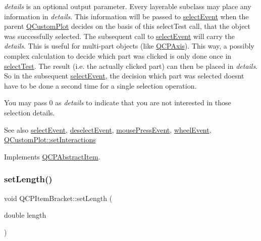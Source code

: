 {\itshape details} is an optional output parameter. Every layerable subclass may place any information in {\itshape details}. This information will be passed to \mbox{\hyperlink{class_q_c_p_abstract_item_aa4b969c58797f39c9c0b6c07c7869d17}{select\+Event}} when the parent \mbox{\hyperlink{class_q_custom_plot}{Q\+Custom\+Plot}} decides on the basis of this select\+Test call, that the object was successfully selected. The subsequent call to \mbox{\hyperlink{class_q_c_p_abstract_item_aa4b969c58797f39c9c0b6c07c7869d17}{select\+Event}} will carry the {\itshape details}. This is useful for multi-\/part objects (like \mbox{\hyperlink{class_q_c_p_axis}{Q\+C\+P\+Axis}}). This way, a possibly complex calculation to decide which part was clicked is only done once in \mbox{\hyperlink{class_q_c_p_item_bracket_a49a6b2f41e0a8c2a2e3a2836027a8455}{select\+Test}}. The result (i.\+e. the actually clicked part) can then be placed in {\itshape details}. So in the subsequent \mbox{\hyperlink{class_q_c_p_abstract_item_aa4b969c58797f39c9c0b6c07c7869d17}{select\+Event}}, the decision which part was selected doesn\textquotesingle{}t have to be done a second time for a single selection operation.

You may pass 0 as {\itshape details} to indicate that you are not interested in those selection details.

\begin{DoxySeeAlso}{See also}
\mbox{\hyperlink{class_q_c_p_abstract_item_aa4b969c58797f39c9c0b6c07c7869d17}{select\+Event}}, \mbox{\hyperlink{class_q_c_p_abstract_item_af9093798cb07a861dcc73f93ca16c0c1}{deselect\+Event}}, \mbox{\hyperlink{class_q_c_p_layerable_af6567604818db90f4fd52822f8bc8376}{mouse\+Press\+Event}}, \mbox{\hyperlink{class_q_c_p_layerable_a47dfd7b8fd99c08ca54e09c362b6f022}{wheel\+Event}}, \mbox{\hyperlink{class_q_custom_plot_a5ee1e2f6ae27419deca53e75907c27e5}{Q\+Custom\+Plot\+::set\+Interactions}} 
\end{DoxySeeAlso}


Implements \mbox{\hyperlink{class_q_c_p_abstract_item_ae41d0349d68bb802c49104afd100ba2a}{Q\+C\+P\+Abstract\+Item}}.

\mbox{\label{class_q_c_p_item_bracket_ac7cfc3da7da9b5c5ac5dfbe4f0351b2a}} 
\subsubsection{\texorpdfstring{setLength()}{setLength()}}
{\footnotesize\ttfamily void Q\+C\+P\+Item\+Bracket\+::set\+Length (\begin{DoxyParamCaption}\item[{double}]{length }\end{DoxyParamCaption})}

